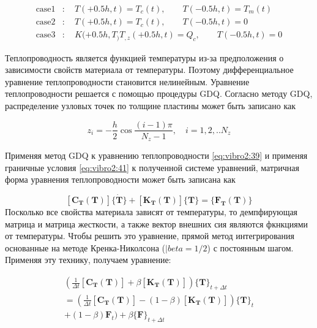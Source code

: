\begin{equation}
	\label{eq:vibro2:41}
	\begin{split}
	\text{case1}&:\quad T(+0.5h, t) = T_c(t), \quad \quad T(-0.5h, t) = T_m(t)
	\\
	\text{case2}&:\quad T(+0.5h, t) = T_c(t), \quad \quad T(-0.5h, t) = 0
	\\
	\text{case3}&:\quad K(+0.5h, T_)T_{,z}(+0.5h, t) = Q_c, \quad \quad T(-0.5h, t) = 0	
	\end{split}
\end{equation}

Теплопроводность является функцией температуры из-за предположения о зависимости свойств материала от температуры.  Поэтому дифференциальное уравнение теплопроводности становится нелинейным. Уравнение теплопроводности решается с помощью процедуры GDQ. Согласно методу GDQ, распределение узловых точек по толщине пластины может быть записано как

\begin{equation}
	\label{eq:vibro2:42}
	z_i = -\frac{h}{2}\cos{\frac{(i-1)\pi}{N_z-1}}, \quad  i = 1,2,..N_z
\end{equation}
	
Применяя метод GDQ к уравнению теплопроводности \cref{eq:vibro2:39} и применяя граничные условия \cref{eq:vibro2:41} к полученной системе уравнений, матричная форма уравнения теплопроводности может быть записана как


\begin{equation}
	\label{eq:vibro2:43}
	[\boldsymbol{C_T(T)}] \{\boldsymbol{\dot{T}} \} + [\boldsymbol{K_T(T)}] \{\boldsymbol{T} \} = \{ \boldsymbol{F_T(T)} \}
\end{equation}
Посколько все свойства материала зависят от температуры, то демпфирующая матрица и матрица жесткости, а также вектор внешних сия являются фкнкциями от температуры. Чтобы решить это уравнение, прямой метод интегрирования основанные на методе Кренка-Николсона (\(|beta=1/2\)) с постоянным шагом. Применяя эту технику, получаем уравнение:

\begin{equation}
	\label{eq:vibro2:44}
	\begin{split}
	(\frac{1}{\Delta t} [\boldsymbol{C_T(T)}]  + \beta [\boldsymbol{K_T(T)}] ) \{\boldsymbol{T} \}_{t+\Delta t} 
	\\
	=(\frac{1}{\Delta t} [\boldsymbol{C_T(T)}]  - (1 - \beta )[\boldsymbol{K_T(T)}] ) \{\boldsymbol{T} \}_{t}
	\\
	+ (1 - \beta )\boldsymbol{F}_t ) + \beta \{\boldsymbol{F} \}_{t+\Delta t}
	 \end{split}
\end{equation}

